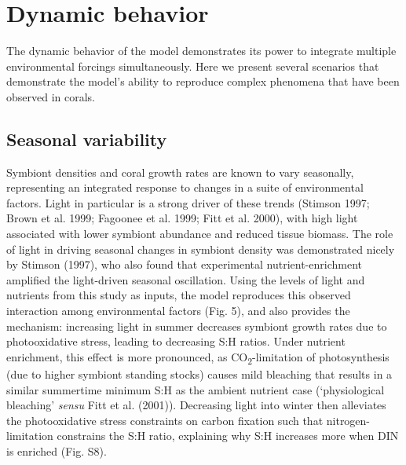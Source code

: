 \documentclass[]{elsarticle} %
\begin{document}
\section{Dynamic behavior}\label{dynamic-behavior}

The dynamic behavior of the model demonstrates its power to integrate
multiple environmental forcings simultaneously. Here we present several
scenarios that demonstrate the model's ability to reproduce complex
phenomena that have been observed in corals.

\subsection{Seasonal variability}\label{seasonal-variability}

Symbiont densities and coral growth rates are known to vary seasonally,
representing an integrated response to changes in a suite of
environmental factors. Light in particular is a strong driver of these
trends (Stimson 1997; Brown et al. 1999; Fagoonee et al. 1999; Fitt et
al. 2000), with high light associated with lower symbiont abundance and
reduced tissue biomass. The role of light in driving seasonal changes in
symbiont density was demonstrated nicely by Stimson (1997), who also
found that experimental nutrient-enrichment amplified the light-driven
seasonal oscillation. Using the levels of light and nutrients from this
study as inputs, the model reproduces this observed interaction among
environmental factors (Fig. 5), and also provides the mechanism:
increasing light in summer decreases symbiont growth rates due to
photooxidative stress, leading to decreasing S:H ratios. Under nutrient
enrichment, this effect is more pronounced, as
CO\textsubscript{2}-limitation of photosynthesis (due to higher symbiont
standing stocks) causes mild bleaching that results in a similar
summertime minimum S:H as the ambient nutrient case (`physiological
bleaching' \emph{sensu} Fitt et al. (2001)). Decreasing light into
winter then alleviates the photooxidative stress constraints on carbon
fixation such that nitrogen-limitation constrains the S:H ratio,
explaining why S:H increases more when DIN is enriched (Fig. S8).
\end{document}
